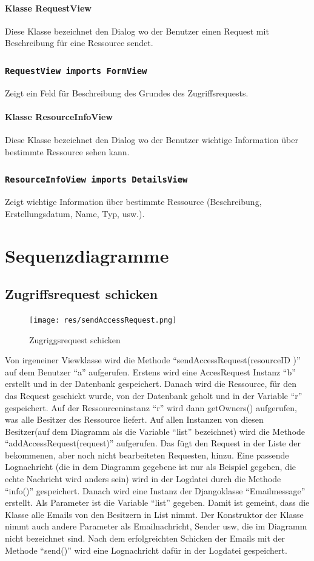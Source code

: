 \documentclass[parskip=full,11pt]{scrartcl}
\newcommand{\class}[1]{\subsubsection*{\lstinline[basicstyle=\ttfamily\large]{#1}}}
\begin{document}
\paragraph*{Klasse RequestView}
Diese Klasse bezeichnet den Dialog wo der Benutzer einen Request mit Beschreibung für eine Ressource sendet.
\class{RequestView imports FormView}
Zeigt ein Feld für Beschreibung des Grundes des Zugriffsrequests.

\paragraph*{Klasse ResourceInfoView}
Diese Klasse bezeichnet den Dialog wo der Benutzer wichtige Information über bestimmte Ressource sehen kann.
\class{ResourceInfoView imports DetailsView}
Zeigt wichtige Information über bestimmte Ressource (Beschreibung, Erstellungsdatum, Name, Typ, usw.).

 \section{Sequenzdiagramme}
 \subsection{Zugriffsrequest schicken}
 \begin{figure}[ht!]
 	\centering
 	\texttt{[image: res/sendAccessRequest.png]}
 	\caption{Zugriggsrequest schicken}
 	\label{fig:sendAccReq}
 \end{figure}
 
Von irgeneiner Viewklasse wird die Methode \enquote{sendAccessRequest(resourceID )} auf dem Benutzer \enquote{a}  aufgerufen. Erstens wird eine AccesRequest Instanz \enquote{b} erstellt und in der Datenbank gespeichert. Danach wird die Ressource, für den das Request geschickt wurde, von der Datenbank geholt und in der Variable \enquote{r} gespeichert. Auf der Ressourceninstanz \enquote{r} wird dann getOwners() aufgerufen, was alle Besitzer des Ressource liefert. Auf allen Instanzen von diesen Besitzer(auf dem Diagramm als die Variable \enquote{list} bezeichnet) wird die Methode  \enquote{addAccessRequest(request)} aufgerufen. Das fügt den Request in der Liste der bekommenen, aber noch nicht bearbeiteten Requesten, hinzu. Eine passende Lognachricht (die in dem Diagramm gegebene ist nur als Beispiel gegeben, die echte Nachricht wird anders sein) wird in der Logdatei durch die Methode \enquote{info()} gespeichert. Danach wird eine Instanz der Djangoklasse \enquote{Emailmessage} erstellt. Als Parameter ist die Variable \enquote{list} gegeben. Damit ist gemeint, dass die Klasse alle Emails von den Besitzern in List nimmt. Der Konstruktor der Klasse nimmt auch andere Parameter als Emailnachricht, Sender usw, die im Diagramm nicht bezeichnet sind. Nach dem erfolgreichten Schicken der Emails mit der Methode  \enquote{send()} wird eine Lognachricht dafür in der Logdatei gespeichert. 
 
\end{document}
